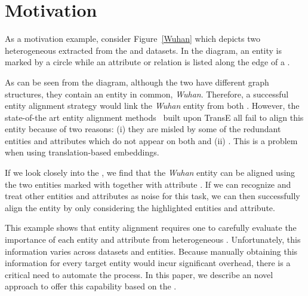 \section{Motivation}
As a motivation example, consider Figure~\ref{Wuhan} which depicts two heterogeneous \KGs extracted from the  and 
datasets. In the diagram, an entity is marked by a circle while an attribute or relation is listed along the edge of a \KG.

As can be seen from the diagram, although the two \KGs have different graph structures, they contain an entity in common, \emph{Wuhan}.
Therefore, a successful entity alignment strategy would link the \emph{Wuhan} entity from both \KGs. However, the state-of-the art entity
alignment methods~\cite{} built upon TransE all fail to align this entity because of two reasons: (i) they are misled by some of the
redundant entities and attributes which do not appear on both \KGs and (ii) . This is a
problem when using translation-based embeddings.

If we look closely into the \KGs, we find that the \emph{Wuhan} entity can be aligned using the two entities marked with  together with attribute . If we can recognize and treat other entities and attributes as noise for this task, we
can then successfully align the entity by only considering the highlighted entities and attribute.

This example shows that entity alignment requires one to carefully evaluate the importance of each entity and attribute from heterogeneous
\KGs. Unfortunately, this information varies across datasets and entities. Because manually obtaining this information for every target
entity would incur significant overhead, there is a critical need to automate the process. In this paper, we describe an novel approach to
offer this capability based on the \GCN.

